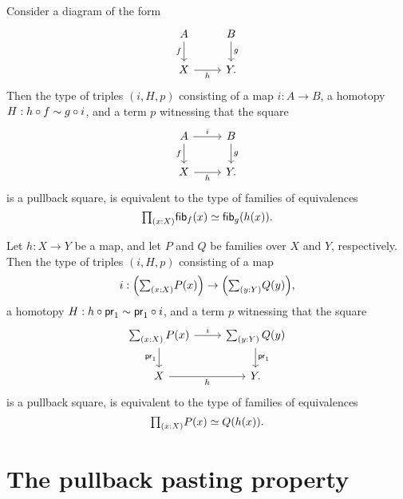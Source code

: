 \begin{thm}\label{thm:pb_fibequiv_complete}
Consider a diagram of the form
\begin{equation*}
\begin{tikzcd}
A \arrow[d,swap,"f"] & B \arrow[d,"g"] \\
X \arrow[r,swap,"h"] & Y.
\end{tikzcd}
\end{equation*}
Then the type of triples $(i,H,p)$ consisting of a map $i:A\to B$, a homotopy $H:h\circ f\sim g\circ i$, and a term $p$ witnessing that the square
\begin{equation*}
\begin{tikzcd}
A \arrow[d,swap,"f"] \arrow[r,"i"] & B \arrow[d,"g"] \\
X \arrow[r,swap,"h"] & Y.
\end{tikzcd}
\end{equation*}
is a pullback square, is equivalent to the type of families of equivalences
\begin{equation*}
\prd{x:X}\eqv{\fib{f}{x}}{\fib{g}{h(x)}}.
\end{equation*}
\end{thm}

\begin{cor}\label{cor:pb_fibequiv_complete}
Let $h:X\to Y$ be a map, and let $P$ and $Q$ be families over $X$ and $Y$, respectively.
Then the type of triples $(i,H,p)$ consisting of a map 
\begin{equation*}
i:\Big(\sm{x:X}P(x)\Big)\to \Big(\sm{y:Y}Q(y)\Big),
\end{equation*}
a homotopy $H:h\circ \mathsf{pr}_{1}\sim \mathsf{pr}_{1}\circ i$, and a term $p$ witnessing that the square
\begin{equation*}
\begin{tikzcd}
\sm{x:X}P(x) \arrow[d,swap,"\proj 1"] \arrow[r,"i"] & \sm{y:Y}Q(y) \arrow[d,"\proj 1"] \\
X \arrow[r,swap,"h"] & Y.
\end{tikzcd}
\end{equation*}
is a pullback square, is equivalent to the type of families of equivalences
\begin{equation*}
\prd{x:X}\eqv{P(x)}{Q(h(x))}.
\end{equation*}
\end{cor}

\section{The pullback pasting property}

